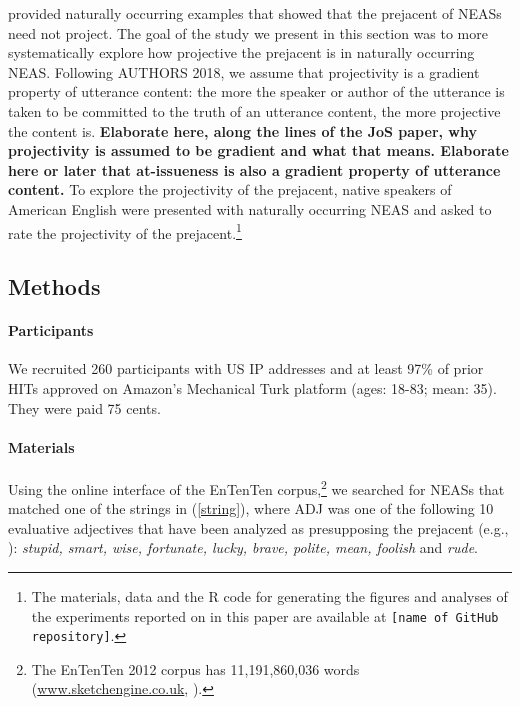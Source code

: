 \documentclass[11pt,fleqn]{article}
\newcommand{\6}{\mbox{$[\hspace*{-.6mm}[$}}
\newcommand{\9}{\mbox{$]\hspace*{-.6mm}]$}}
\begin{document}
\citet{karttunen-etal2014} provided naturally occurring examples that showed that the prejacent of NEASs need not project. The goal of the study we present in this section was to more systematically explore how projective the prejacent is in naturally occurring NEAS. Following AUTHORS 2018, we assume that projectivity is a gradient property of utterance content: the more the speaker or author of the utterance is taken to be committed to the truth of an utterance content, the more projective the content is. {\bf Elaborate here, along the lines of the JoS paper, why projectivity is assumed to be gradient and what that means. Elaborate here or later that at-issueness is also a gradient property of utterance content.} To explore the projectivity of the prejacent, native speakers of American English were presented with naturally occurring NEAS and asked to rate the projectivity of the prejacent.\footnote{\label{f-git}The
materials, data and the R code for generating the figures and analyses of the experiments reported on in this paper are available at {\tt [name of GitHub repository]}.}

\subsection{Methods}

\paragraph{Participants} We recruited 260 participants with US IP addresses and at least 97\% of prior HITs approved on Amazon's Mechanical Turk platform (ages: 18-83; mean: 35). They were paid 75 cents.  


\paragraph{Materials} Using the online interface of the EnTenTen corpus,\footnote{The EnTenTen 2012 corpus has 11,191,860,036 words
(\url{www.sketchengine.co.uk}, \citealt{ententen}).} we searched for NEASs that matched one of the strings in (\ref{string}), where ADJ was one of the following 10 evaluative adjectives that have been analyzed as presupposing the prejacent (e.g., \citealt{norrick78,karttunen-etal2014}): {\em stupid, smart, wise,
fortunate, lucky, brave, polite, mean, foolish} and {\em rude}.
\end{document}

